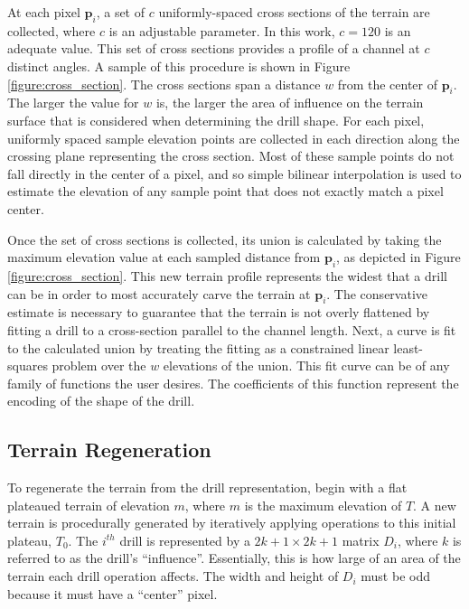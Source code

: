 At each pixel $\textbf{p}_{i}$, a set of $c$ uniformly-spaced cross sections of the terrain are collected, where $c$ is an adjustable parameter. In this work, $c=120$ is an adequate value. This set of cross sections provides a profile of a channel at $c$ distinct angles. A sample of this procedure is shown in Figure \ref{figure:cross_section}. The cross sections span a distance $w$ from the center of $\textbf{p}_{i}$.
The larger the value for $w$ is, the larger the area of influence on the terrain surface that is considered when determining the drill shape. For each pixel,
uniformly spaced sample elevation points are collected in each direction along the crossing plane representing the cross section. Most of these sample points do not fall directly in the center of a pixel, and so simple bilinear interpolation is used to estimate the elevation of any sample point that does not exactly match a pixel center.

Once the set of cross sections is collected, its union is calculated by taking the maximum elevation value at each sampled distance from $\textbf{p}_{i}$, as depicted in Figure \ref{figure:cross_section}. This new terrain profile represents the widest that a drill can be in order to most accurately carve the terrain at $\textbf{p}_{i}$. 
The conservative estimate is necessary to guarantee that the terrain is not overly flattened by fitting a drill to a cross-section parallel to the channel length.
Next, a curve is fit to the calculated union by treating the fitting as a constrained linear least-squares problem over the $w$ elevations of the union.
This fit curve can be of any family of functions the user desires. The coefficients of this function represent the encoding of the shape of the drill.



\subsection{Terrain Regeneration}

To regenerate the terrain from the drill representation, begin with a flat plateaued terrain of elevation $m$, where $m$ 
is the maximum elevation of $T$. A new terrain is procedurally generated by iteratively applying operations to this initial plateau, $T_{0}$. 
The $i^{th}$ 
drill
is represented by a $2k + 1 \times 2k + 1$ matrix 
$D_{i}$, where $k$ is referred to as the drill's ``influence''. Essentially, this is how large of an area of the terrain each drill operation 
affects.
The width and height of $D_{i}$ must be odd because it must have a ``center'' pixel.

